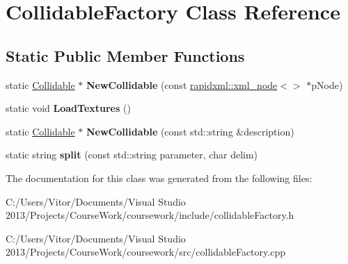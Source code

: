 \hypertarget{class_collidable_factory}{}\section{Collidable\+Factory Class Reference}
\label{class_collidable_factory}
\subsection*{Static Public Member Functions}
\begin{DoxyCompactItemize}
\item 
\hypertarget{class_collidable_factory_a303d4cd205bdb1f3aae93cd5dba7c2f1}{}static \hyperlink{class_collidable}{Collidable} $\ast$ {\bfseries New\+Collidable} (const \hyperlink{classrapidxml_1_1xml__node}{rapidxml\+::xml\+\_\+node}$<$$>$ $\ast$p\+Node)\label{class_collidable_factory_a303d4cd205bdb1f3aae93cd5dba7c2f1}

\item 
\hypertarget{class_collidable_factory_a404d4d7388ae35e9c321e51f3fbdf20e}{}static void {\bfseries Load\+Textures} ()\label{class_collidable_factory_a404d4d7388ae35e9c321e51f3fbdf20e}

\item 
\hypertarget{class_collidable_factory_aa6507a9b141c1d4a8820cf7fed50bdf4}{}static \hyperlink{class_collidable}{Collidable} $\ast$ {\bfseries New\+Collidable} (const std\+::string \&description)\label{class_collidable_factory_aa6507a9b141c1d4a8820cf7fed50bdf4}

\item 
\hypertarget{class_collidable_factory_af3f007e55b937202661281397f32c433}{}static string {\bfseries split} (const std\+::string parameter, char delim)\label{class_collidable_factory_af3f007e55b937202661281397f32c433}

\end{DoxyCompactItemize}


The documentation for this class was generated from the following files\+:\begin{DoxyCompactItemize}
\item 
C\+:/\+Users/\+Vitor/\+Documents/\+Visual Studio 2013/\+Projects/\+Course\+Work/coursework/include/collidable\+Factory.\+h\item 
C\+:/\+Users/\+Vitor/\+Documents/\+Visual Studio 2013/\+Projects/\+Course\+Work/coursework/src/collidable\+Factory.\+cpp\end{DoxyCompactItemize}
